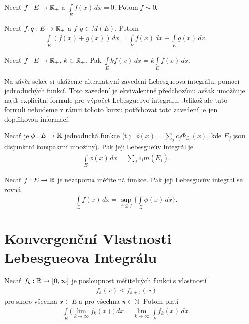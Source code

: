 \begin{theorem}
Nechť $f:E \to \mathbb{R}_+$ a $\int \limits _{E} f(x) \, dx=0$. Potom $f \sim 0$.
\end{theorem}

\begin{theorem}
Nechť $f,g:E \to \mathbb{R}_+$ a $f,g \in M(E)$. Potom 
\begin{align*}
\int \limits _E (f(x)+g(x)) \, dx = \int \limits _E f(x) \, dx+\int \limits _E g(x) \, dx.
\end{align*}
\end{theorem}

\begin{theorem}
Nechť $f:E \to \mathbb{R}_+$, $k \in \mathbb{R}_+$. Pak $\int \limits _E k f(x) \, dx = k \int \limits _E f(x) \, dx$.
\end{theorem}

Na závěr sekce si ukážeme alternativní zavedení Lebesgueova integrálu, pomocí jednoduchých funkcí. Toto zavedení je ekvivalentně předchozímu avšak umožňuje najít explicitní formule pro výpočet Lebesgueovo integrálu. Jelikož ale tuto formuli nebudeme v rámci tohoto kurzu potřebovat toto zavedení je jen doplňkovou informací.

\begin{dusledek}
Nechť je $\phi:E \to \mathbb{R}$ jednoduchá funkce (t.j. $\phi(x)=\sum \limits _j c_j \Phi_{E_j}(x)$, kde $E_j$ jsou disjunktní kompaktní množiny). Pak její Lebesgue\r uv integrál je
\begin{align*}
\int \limits _{E} \phi(x) \, dx = \sum \limits _j c_j m(E_j).
\end{align*}
\end{dusledek}

\begin{dusledek}
Nechť $f:E \to \mathbb{R}$ je nezáporná měřitelná funkce. Pak její Lebesgue\r uv integrál se rovná
\begin{align*}
\int \limits _{E} f(x) \, dx = \sup \limits _{\phi \leq f} \{\int \limits _{E} \phi(x) \, dx\}.
\end{align*}
\end{dusledek}


\section{Konvergenční Vlastnosti Lebesgueova Integrálu}




\begin{theorem}
\label{veta_2.1_Beppo-Levi}
Nechť $f_k:\mathbb{R} \to [0,\infty]$ je posloupnost měřitelných funkcí s vlastností
\begin{align}
\label{vztah_monotone_convergence_rust}
f_k(x) \leq f_{k+1}(x)
\end{align}
pro skoro všechna $x \in E$ a pro všechna $n \in \mathbb{N}$. Potom platí
\begin{align*}
\int \limits _{E} \Big(\lim \limits _{k \to \infty} f_k(x) \Big)\, dx= \lim \limits _{k \to \infty} \int \limits _{E} f_k(x) \, dx.
\end{align*}
\end{theorem}

